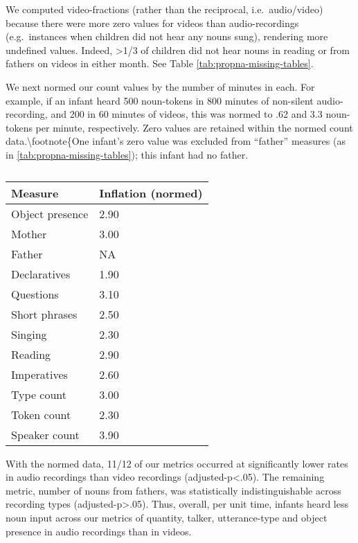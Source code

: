 \documentclass[floatsintext,man]{apa6}
\theoremstyle{definition}
\theoremstyle{definition}
\theoremstyle{definition}
\theoremstyle{remark}
\begin{document}
We computed video-fractions (rather than the reciprocal,
i.e.~audio/video) because there were more zero values for videos than
audio-recordings (e.g.~instances when children did not hear any nouns
sung), rendering more undefined values. Indeed, \textgreater{}1/3 of
children did not hear nouns in reading or from fathers on videos in
either month. See Table \ref{tab:propna-missing-tables}.

We next normed our count values by the number of minutes in each. For
example, if an infant heard 500 noun-tokens in 800 minutes of non-silent
audio-recording, and 200 in 60 minutes of videos, this was normed to .62
and 3.3 noun-tokens per minute, respectively. Zero values are retained
within the normed count data.\textbackslash{}footnote\{One infant's zero
value was excluded from \enquote{father} measures (as in
\ref{tab:propna-missing-tables}); this infant had no father.

\begin{table}[tbp]
\begin{center}
\begin{threeparttable}
\caption{\label{tab:normtable}}
\begin{tabular}{ll}
\toprule
Measure & \multicolumn{1}{c}{Inflation (normed)}\\
\midrule
Object presence & 2.90\\
Mother & 3.00\\
Father & NA\\
Declaratives & 1.90\\
Questions & 3.10\\
Short phrases & 2.50\\
Singing & 2.30\\
Reading & 2.90\\
Imperatives & 2.60\\
Type count & 3.00\\
Token count & 2.30\\
Speaker count & 3.90\\
\bottomrule
\end{tabular}
\end{threeparttable}
\end{center}
\end{table}

With the normed data, 11/12 of our metrics occurred at significantly
lower rates in audio recordings than video recordings
(adjusted-p\textless{}.05). The remaining metric, number of nouns from
fathers, was statistically indistinguishable across recording types
(adjusted-p\textgreater{}.05). Thus, overall, per unit time, infants
heard less noun input across our metrics of quantity, talker,
utterance-type and object presence in audio recordings than in videos.
\end{document}
